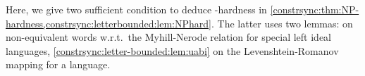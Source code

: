 
Here, we give two sufficient condition to deduce \NP-hardness
in \cref{constrsync:thm:NP-hardness,constrsync:letterbounded:lem:NPhard}.
The latter uses two lemmas: 
on non-equivalent words w.r.t.~the Myhill-Nerode relation
for special left ideal languages,
\cref{constrsync:letter-bounded:lem:uabi}
on the Levenshtein-Romanov mapping for a language.

%

